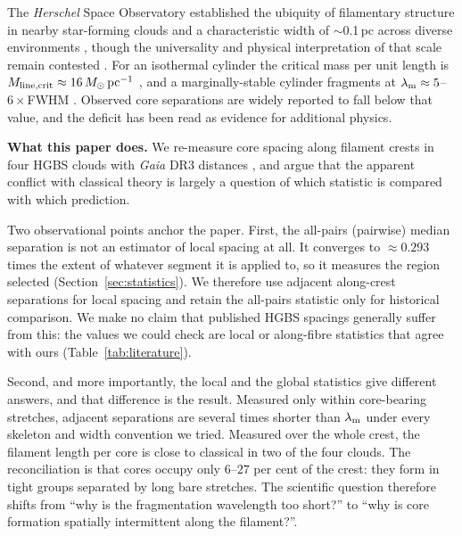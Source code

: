 \documentclass[usenatbib,twoside,twocolumn]{mnras}
\begin{document}
The \textit{Herschel} Space Observatory established the ubiquity of filamentary structure in nearby star-forming clouds \citep{Andre2010} and a characteristic width of $\sim$0.1\,pc across diverse environments \citep{Arzoumanian2011}, though the universality and physical interpretation of that scale remain contested \citep{Panopoulou2017,Panopoulou2022}. For an isothermal cylinder the critical mass per unit length is $M_{\rm line,crit}\approx16\,M_\odot\,{\rm pc^{-1}}$ \citep{Ostriker1964}, and a marginally-stable cylinder fragments at $\lambda_{\rm m}\approx5$--$6\times$FWHM \citep{Inutsuka1992,Fischera2012}. Observed core separations are widely reported to fall below that value, and the deficit has been read as evidence for additional physics.

\smallskip\noindent\textbf{What this paper does.} We re-measure core spacing along filament crests in four HGBS clouds with \textit{Gaia} DR3 distances \citep{Zhang2023}, and argue that the apparent conflict with classical theory is largely a question of which statistic is compared with which prediction.

Two observational points anchor the paper. First, the all-pairs (pairwise) median separation is not an estimator of local spacing at all. It converges to $\approx0.293$ times the extent of whatever segment it is applied to, so it measures the region selected (Section~\ref{sec:statistics}). We therefore use adjacent along-crest separations for local spacing and retain the all-pairs statistic only for historical comparison. We make no claim that published HGBS spacings generally suffer from this: the values we could check are local or along-fibre statistics that agree with ours (Table~\ref{tab:literature}).

Second, and more importantly, the local and the global statistics give different answers, and that difference is the result. Measured only within core-bearing stretches, adjacent separations are several times shorter than $\lambda_{\rm m}$ under every skeleton and width convention we tried. Measured over the whole crest, the filament length per core is close to classical in two of the four clouds. The reconciliation is that cores occupy only $6$--$27$ per cent of the crest: they form in tight groups separated by long bare stretches. The scientific question therefore shifts from ``why is the fragmentation wavelength too short?'' to ``why is core formation spatially intermittent along the filament?''.
\end{document}
